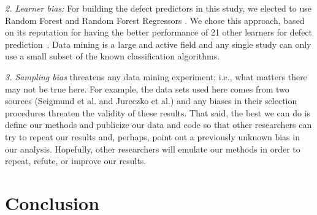 \documentclass[conference]{IEEEtran}
\begin{document}
 
{\em 2. Learner bias: } For building the defect predictors in this study, we elected
to use  Random Forest  and Random Forest Regressors .
We chose this approach,  based on its reputation for having the better  performance of 
21 other learners for defect prediction~\cite{lessmann}.
Data mining is a
large and active field and any single study can only use a small
subset of the known classification algorithms.  


{\em 3. Sampling bias} threatens any data mining experiment; i.e., what matters
there may not be true here. For example, the data sets used here comes from two sources
(Seigmund et al. and Jureczko et al.) and any biases in their selection procedures
threaten the validity of these results. 
That said,
the best we can do is define our methods and publicize our data and code so that other researchers can
try to repeat our results and, perhaps, point out a previously unknown bias
in our analysis. Hopefully, other researchers will emulate our methods in
order to repeat, refute, or improve our results. 



 




%


\section{Conclusion}
 
\end{document}
